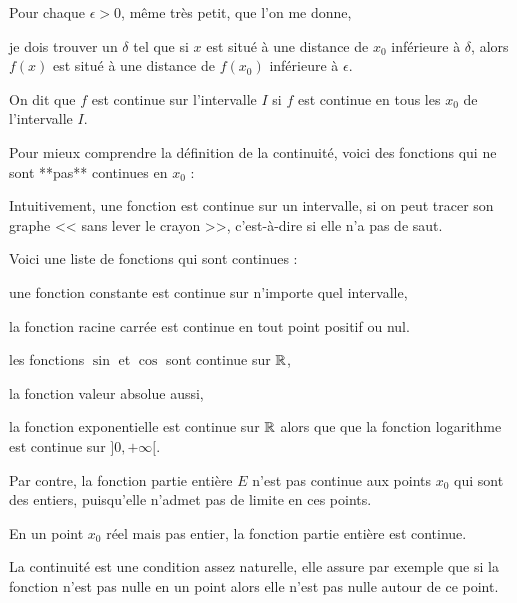 Pour chaque $\epsilon>0$, même très petit, que l'on me donne, 


je dois trouver un $\delta$ tel que si 
$x$ est situé à une distance de $x_0$ inférieure à $\delta$, alors
$f(x)$ est situé à une distance de $f(x_0)$ inférieure à $\epsilon$.

 
\change 
 
On dit que $f$ est continue sur l'intervalle $I$ si $f$ est continue 
en tous les $x_0$ de l'intervalle $I$.


\diapo

Pour mieux comprendre la définition de la continuité,
voici des fonctions qui ne sont **pas** continues en $x_0$ :

Intuitivement, une fonction est continue sur un intervalle, 
si on peut tracer son graphe 
<< sans lever le crayon >>, c'est-à-dire si elle n'a pas de saut.




\diapo


Voici une liste de fonctions qui sont continues :

\change

une fonction constante est continue sur n'importe quel intervalle,

\change

la fonction racine carrée  est continue en tout point positif ou nul.

\change

les fonctions $\sin$ et $\cos$ sont continue sur $\mathbb{R}$,

\change

la fonction valeur absolue aussi,

\change

 la fonction exponentielle est continue sur $\mathbb{R}$
alors que que la fonction logarithme est continue sur $]0,+\infty[$.

\change


Par contre, la fonction partie entière $E$ n'est pas continue aux points 
$x_0$ qui sont des entiers, puisqu'elle n'admet pas de limite en ces points. 

En un point $x_0$ réel mais pas entier, la fonction partie entière est continue.



\diapo


La continuité est une condition assez naturelle, elle assure par exemple que 
si la fonction n'est pas nulle en un point 
alors elle n'est pas nulle autour de ce point. 

